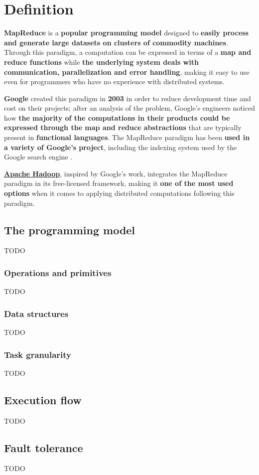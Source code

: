 \section{Definition}
\textbf{MapReduce} is a \textbf{popular programming model} designed to \textbf{easily process and generate large datasets on clusters of commodity machines}. Through this paradigm, a computation can be expressed in terms of a \textbf{map and reduce functions} while \textbf{the underlying system deals with communication, parallelization and error handling}, making it easy to use even for programmers who have no experience with distributed systems.

\textbf{Google} created this paradigm in \textbf{2003} in order to reduce development time and cost on their projects; after an analysis of the problem, Google's engineers noticed how \textbf{the majority of the computations in their products could be expressed through the map and reduce abstractions} that are typically present in \textbf{functional languages}. The MapReduce paradigm has been \textbf{used in a variety of Google's project}, including the indexing system used by the Google search engine \cite{google_mapreduce}.

\textbf{\href{https://hadoop.apache.org/}{Apache Hadoop}}, inspired by Google's work, integrates the MapReduce paradigm in its free-licensed framework, making it \textbf{one of the most used options} when it comes to applying distributed computations following this paradigm.

\subsection{The programming model}
TODO

\subsubsection{Operations and primitives}
TODO

\subsubsection{Data structures}
TODO

\subsubsection{Task granularity}
TODO

\subsection{Execution flow}
TODO

\subsection{Fault tolerance}
TODO